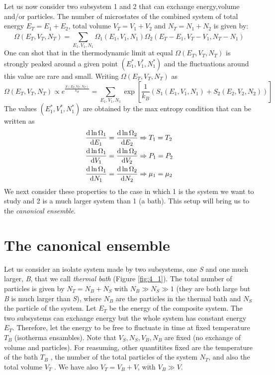 \documentclass[../main/main.tex]{subfiles}
\begin{document}
Let us now consider two subsystem 1 and 2 that can exchange energy,volume and/or particles.
The number of microstates of the combined system of total energy \( E_T = E_1 + E_2 \), total volume \( V_T = V_1 + V_2 \) and \( N_T = N_1 + N_2 \) is given by:
\begin{equation}
  \Omega (E_T,V_T,N_T) = \sum_{E_1,V_1,N_1}^{} \Omega _1 (E_1,V_1,N_1) \Omega _2 (E_T - E_1,V_T-V_1,N_T-N_1)
\end{equation}
One can shot that in the thermodynamic limit at equal \(  \Omega (E_T,V_T,N_T) \) is strongly peaked around a given point \( (E_1^*,V_1^*,N_1^*) \) and the fluctuations around this value are rare and small. Writing \( \Omega (E_T,V_T,N_T)  \) as
\begin{equation}
  \Omega (E_T,V_T,N_T) \propto e^{\frac{S(E_T,V_T,N_T) }{k_B}} = \sum_{E_1,V_1,N_1}^{} \exp[ \frac{1}{k_B} (S_1 (E_1,V_1, N_1) + S_2 (E_2,V_2, N_2) ) ]
\end{equation}
The values \( (E_1^*,V_1^*,N_1^*) \) are obtained by the max entropy condition that can be written as
\begin{subequations}
\begin{align}
  \dv{\ln{\Omega _1} }{E_1}  &= \dv{\ln{\Omega _2} }{E_2} \Rightarrow  T_1 = T_2 \\
  \dv{\ln{\Omega _1} }{V_1}  &= \dv{\ln{\Omega _2} }{V_2} \Rightarrow  P_1 = P_2 \\
  \dv{\ln{\Omega _1} }{N_1}  &= \dv{\ln{\Omega _2} }{N_2} \Rightarrow  \mu _1 = \mu _2
\end{align}
\end{subequations}
We next consider these properties to the case in which 1 is the system we want to study and 2 is a much larger system than 1 (a bath). This setup will bring us to the \emph{canonical ensemble}.

\section{The canonical ensemble}
Let us consider an isolate system made by two subsystems, one \emph{S} and one much larger, \emph{B}, that we call \emph{thermal bath} (Figure \ref{fig:4_1}). The total number of particles is given by \( N_T = N_B + N_S\)  with \( N_B \gg N_S \gg 1 \) (they are both large but \emph{B} is much larger than \emph{S}), where \( N_B \) are the particles in the thermal bath and \( N_S \) the particle of the system.
Let \( E_T \) be the energy of the composite system. The two subsystems can exchange energy but the whole system has constant energy  \( E_T \). Therefore, let the energy to be free to fluctuate in time at fixed temperature  \( T_B \) (isotherma ensambles).
Note that \( V_S,N_S,V_B,N_B \) are fixed (no exchange of volume and particles). For reasuming, other quantitites fixed are the temperature of the bath \( T_B \) , the number of the total particles of the system \( N_T \), and also the total volume \( V_T \) .
 We have also \( V_T = V_B + V \), with   \( V_B \gg V \).
\end{document}
